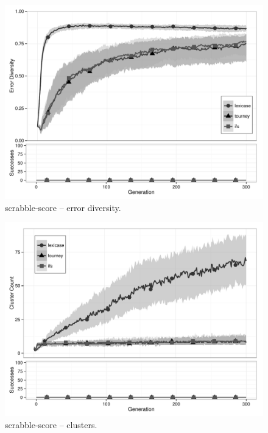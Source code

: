 \begin{figure}%
\centering
\includegraphics[width=11.5cm]{scrabble-score-diversity.pdf}
\caption{scrabble-score -- error diversity.}
\label{scrabble-scoreDiv}
\end{figure}

\begin{figure}%
\centering
\includegraphics[width=11.5cm]{scrabble-score-cluster.pdf}
\caption{scrabble-score -- clusters.}
\label{scrabble-scoreClu}
\end{figure}

